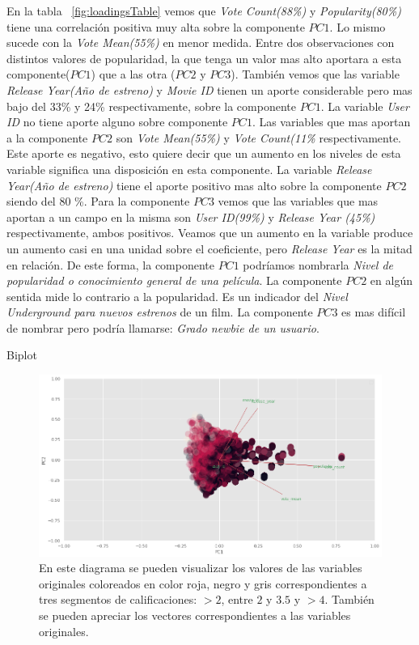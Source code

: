 \documentclass[11pt,a4paper,twoside]{thesis}
\begin{document}
En la tabla ~\ref{fig:loadingsTable} vemos que \textit{Vote Count(88\%)} y \textit{Popularity(80\%)} tiene una correlación positiva muy alta sobre la componente $PC1$. Lo mismo sucede con la \textit{Vote Mean(55\%)} en menor medida. Entre dos observaciones con distintos valores de popularidad, la que tenga un valor mas alto aportara a esta componente($PC1$) que a las otra ($PC2$ y $PC3$). También vemos que las variable \textit{Release Year(Año de estreno)} y \textit{Movie ID} tienen un aporte considerable pero mas bajo del 33\% y 24\% respectivamente, sobre la componente $PC1$. La variable \textit{User ID} no tiene aporte alguno sobre componente $PC1$. Las variables que mas aportan a la componente $PC2$ son \textit{Vote Mean(55\%)} y \textit{Vote Count(11\%} respectivamente. Este aporte es negativo, esto quiere decir que un aumento en los niveles de esta variable significa una disposición en esta componente. La variable \textit{Release Year(Año de estreno)} tiene el aporte positivo mas alto sobre la componente $PC2$ siendo del 80 \%. Para la componente $PC3$ vemos que las variables que mas aportan a un campo en la misma son \textit{User ID(99\%)} y \textit{Release Year (45\%)} respectivamente, ambos positivos. Veamos que un aumento en la variable  produce un aumento casi en una unidad sobre el coeficiente, pero \textit{Release Year} es la mitad en relación. De este forma, la componente $PC1$ podríamos nombrarla \textit{Nivel de popularidad o conocimiento general de una película}. La componente $PC2$ en algún sentida mide lo contrario a la popularidad. Es un indicador del \textit{Nivel Underground para nuevos estrenos} de un film.  La componente $PC3$ es mas difícil de nombrar pero podría llamarse: \textit{Grado newbie de un usuario}.


\begin{description}
	\item[Biplot]
\end{description}
\begin{figure}[h!]
	\centering
	\includegraphics[width=15cm]{./images/PCA-biplot.png}
	\caption{En este diagrama se pueden visualizar los valores de las variables originales coloreados en color roja, negro y gris correspondientes a tres segmentos de calificaciones: $>2$, entre $2$ y $3.5$ y $>4$. También se pueden apreciar los vectores correspondientes a las variables originales.}
	\label{fig:biplot}
\end{figure}
\end{document}
